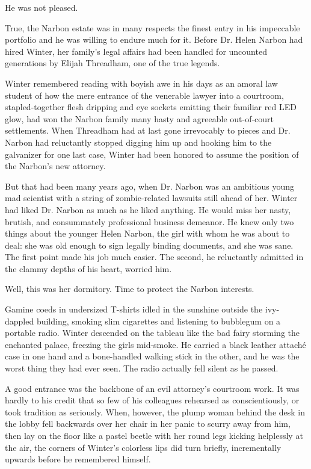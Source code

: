 \documentclass[ebook,10pt]{memoir}
\begin{document}
He was not pleased. 

True, the Narbon estate was in many respects the finest entry in his
impeccable portfolio and he was willing to endure much for it. Before
Dr. Helen Narbon had hired Winter, her family's legal affairs had been
handled for uncounted generations by Elijah Threadham, one of the true
legends.

Winter remembered reading with boyish awe in his days as an amoral law
student of how the mere entrance of the venerable lawyer into a
courtroom, stapled-together flesh dripping and eye sockets emitting
their familiar red LED glow, had won the Narbon family many hasty and
agreeable out-of-court settlements. When Threadham had at last gone
irrevocably to pieces and Dr. Narbon had reluctantly stopped digging
him up and hooking him to the galvanizer for one last case, Winter had
been honored to assume the position of the Narbon's new attorney.

But that had been many years ago, when Dr. Narbon was an ambitious
young mad scientist with a string of zombie-related lawsuits still
ahead of her. Winter had liked Dr. Narbon as much as he liked
anything. He would miss her nasty, brutish, and consummately
professional business demeanor. He knew only two things about the
younger Helen Narbon, the girl with whom he was about to deal: she was
old enough to sign legally binding documents, and she was sane. The
first point made his job much easier. The second, he reluctantly
admitted in the clammy depths of his heart, worried him.

Well, this was her dormitory. Time to protect the Narbon interests.

Gamine coeds in undersized T-shirts idled in the sunshine outside the
ivy-dappled building, smoking slim cigarettes and listening to
bubblegum on a portable radio. Winter descended on the tableau like
the bad fairy storming the enchanted palace, freezing the girls
mid-smoke. He carried a black leather attach\'{e} case in one hand and
a bone-handled walking stick in the other, and he was the worst thing
they had ever seen. The radio actually fell silent as he passed.

A good entrance was the backbone of an evil attorney's courtroom
work. It was hardly to his credit that so few of his colleagues
rehearsed as conscientiously, or took tradition as seriously. When,
however, the plump woman behind the desk in the lobby fell backwards
over her chair in her panic to scurry away from him, then lay on the
floor like a pastel beetle with her round legs kicking helplessly at
the air, the corners of Winter's colorless lips did turn briefly,
incrementally upwards before he remembered himself.
\end{document}
